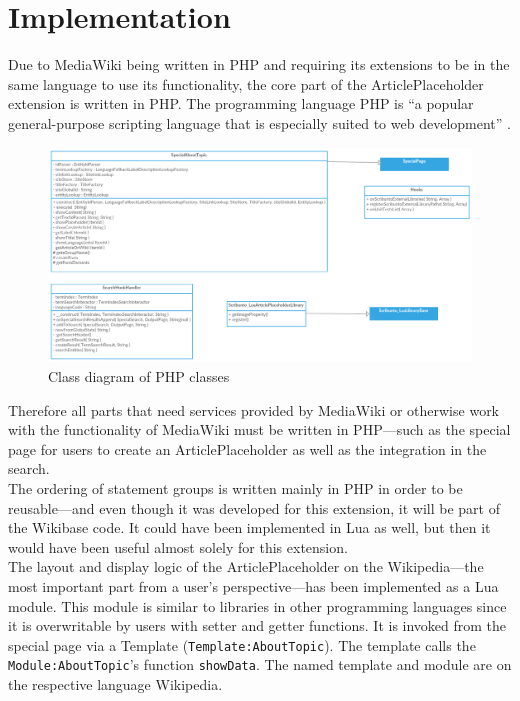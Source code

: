 \chapter{Implementation}
	
	Due to MediaWiki being written in PHP and requiring its extensions to be in the same language to use its functionality, the core part of the ArticlePlaceholder extension is written in PHP. The programming language PHP is ``a popular general-purpose scripting language that is especially suited to web development'' \citep{php:01}. \\
	\begin{figure}[H]
		\centering
		\includegraphics[width=\textwidth]{diagrams/ArticlePlaceholderClassDiagram.png}
		\caption{Class diagram of PHP classes}
		\label{fig:ClassDiagramPHP}
	\end{figure}
	Therefore all parts that need services provided by MediaWiki or otherwise work with the functionality of MediaWiki must be written in PHP---such as the special page for users to create an ArticlePlaceholder as well as the integration in the search. \\
	The ordering of statement groups is written mainly in PHP in order to be reusable---and even though it was developed for this extension, it will be part of the Wikibase code. It could have been implemented in Lua as well, but then it would have been useful almost solely for this extension. \\
	The layout and display logic of the ArticlePlaceholder on the Wikipedia---the most important part from a user's perspective---has been implemented as a Lua module. This module is similar to libraries in other programming languages since it is overwritable by users with setter and getter functions. It is invoked from the special page via a Template (\texttt{\justify Template:AboutTopic}). The template calls the \texttt{\justify Module:AboutTopic}'s function \texttt{\justify showData}. The named template and module are on the respective language Wikipedia. \\
	
	
	
	
	
	
	
	
	
	